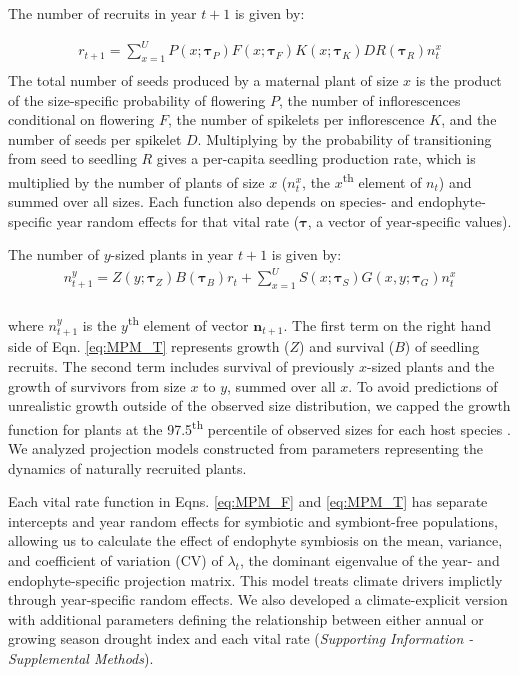\documentclass[lineno, sn-basic]{sn-jnl}%
\begin{document}
The number of recruits in year $t+1$ is given by:

\begin{equation} 
	\label{eq:MPM_F}
	\begin{aligned}
		r_{t+1} = \sum_{x=1}^{U} P(x; \pmb{\tau}_{P})F(x; \pmb{\tau}_{F})K(x; \pmb{\tau}_{K})DR(\pmb{\tau}_{R}) n^x_{t}\\
	\end{aligned}
\end{equation}
The total number of seeds produced by a maternal plant of size $x$ is the product of the size-specific probability of flowering $P$, the number of inflorescences conditional on flowering $F$, the number of spikelets per inflorescence $K$, and the number of seeds per spikelet $D$. 
Multiplying by the probability of transitioning from seed to seedling $R$ gives a per-capita seedling production rate, which is multiplied by the number of plants of size $x$ ($n^x_{t}$, the $x$\textsuperscript{th} element of \textbf{$n_{t}$}) and summed over all sizes. 
Each function also depends on species- and endophyte-specific year random effects for that vital rate ($\pmb{\tau}$, a vector of year-specific values). 

The number of $y$-sized plants in year $t+1$ is given by:
\begin{equation} 
	\label{eq:MPM_T}
	\begin{aligned}
		n^y_{t+1} = Z(y; \pmb{\tau}_{Z})B(\pmb{\tau}_{B})r_{t}  + 
		\sum_{x=1}^{U} S(x; \pmb{\tau}_{S})G(x,y; \pmb{\tau}_{G}) n^x_{t}\\
	\end{aligned}
\end{equation}

where $n^y_{t+1}$ is the $y$\textsuperscript{th} element of vector {$\textbf{n}_{t+1}$}.
The first term on the right hand side of Eqn. \ref{eq:MPM_T} represents growth ($Z$) and survival ($B$) of seedling recruits. 
The second term includes survival of previously $x$-sized plants and the growth of survivors from size $x$ to $y$, summed over all $x$. 
To avoid predictions of unrealistic growth outside of the observed size distribution, we capped the growth function for plants at the 97.5\textsuperscript{th} percentile of observed sizes for each host species \citep{williams2012avoiding}. 
We analyzed projection models constructed from parameters representing the dynamics of naturally recruited plants.	

Each vital rate function in Eqns. \ref{eq:MPM_F} and \ref{eq:MPM_T} has separate intercepts and year random effects for symbiotic and symbiont-free populations, allowing us to calculate the effect of endophyte symbiosis on the mean, variance, and coefficient of variation (CV) of $\lambda_{t}$, the dominant eigenvalue of the year- and endophyte-specific projection matrix. 
This model treats climate drivers implictly through year-specific random effects. 
We also developed a climate-explicit version with additional parameters defining the relationship between either annual or growing season drought index and each vital rate (\emph{Supporting Information - Supplemental Methods}).
\end{document}
